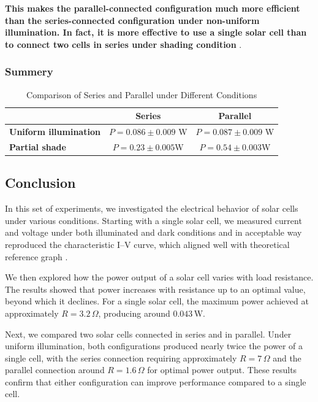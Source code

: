 \documentclass[12pt]{article}
\begin{document}
\textbf{This makes the parallel-connected configuration much more efficient than the series-connected configuration under non-uniform illumination.
In fact, it is more effective to use a single solar cell than to connect two cells in series under shading condition }.
\subsubsection{Summery}
\begin{table}[H]
    \centering
    \begin{tabular}{|l|c|c|}
    \hline
    & \textbf{Series} & \textbf{Parallel} \\ \hline
    \textbf{Uniform illumination} &\( P = 0.086\pm 0.009 \) W &\( P = 0.087\pm 0.009 \) W \\ \hline
    \textbf{Partial shade} &\(P=  0.23\pm 0.005\)W &\( P=0.54 \pm 0.003 \)W \\ \hline
    \end{tabular}
    \caption{Comparison of Series and Parallel under Different Conditions}
    \label{tab:sum}
\end{table}













\subsection{Conclusion}

In this set of experiments, we investigated the electrical behavior  of solar cells under various conditions. Starting with a single solar cell, we measured current and voltage under both illuminated and dark conditions and in acceptable way reproduced the  characteristic I–V curve, which aligned well with theoretical reference graph .

We then explored how the power output of a solar cell varies with load resistance. The results showed that power increases with resistance up to an optimal value, beyond which it declines. For a single solar cell, the maximum power  achieved  at approximately \( R = 3.2\, \Omega \), producing around \( 0.043 \, \text{W} \).

Next, we compared two solar cells connected in series and in parallel. Under uniform illumination, both configurations produced  nearly twice the power of a single cell, with the series connection requiring approximately \( R = 7 \, \Omega \) and the parallel connection around \( R = 1.6 \, \Omega \) for optimal power output. These results confirm that either configuration can improve performance compared to a single cell. 
\end{document}

